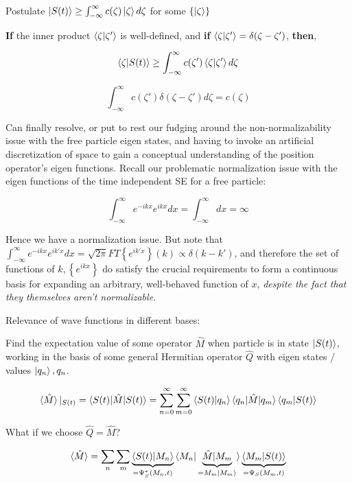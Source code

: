 \documentclass{article}
\begin{document}

Postulate $\ket{S(t)} \geq \int_{- \infty}^\infty c(\zeta) \ket{\zeta} d\zeta$ for some $\{\ket{\zeta}\}$

\textbf{If} the inner product $\braket{\zeta|\zeta'}$ is well-defined, and \textbf{if} $\braket{\zeta|\zeta'} = \delta(\zeta - \zeta')$, \textbf{then},

$$\braket{\zeta|S(t)} \geq \int_{- \infty}^\infty c(\zeta') \braket{\zeta|\zeta'} d \zeta$$

$$\int_{- \infty}^\infty c(\zeta') \delta(\zeta - \zeta') d \zeta = c(\zeta)$$


Can finally resolve, or put to rest our fudging around the non-normalizability issue with the free particle eigen states, and having to invoke an artificial discretization of space to gain a conceptual understanding of the position operator’s eigen functions. Recall our problematic normalization issue with the eigen functions of the time independent SE for a free particle:

$$\int_{- \infty}^\infty e^{- ikx} e^{ikx} dx = \int_{- \infty}^\infty dx = \infty$$

Hence we have a normalization issue. But note that $\int_{- \infty}^\infty e^{- ikx} e^{ik'x} dx = \sqrt{2 \pi} FT \left\{e^{ik'x} \right\} (k) \propto \delta(k-k')$, and therefore the set of functions of $k, \left\{ e^{ikx} \right\}$ do satisfy the crucial requirements to form a continuous basis for expanding an arbitrary, well-behaved function of $x$, \textit{despite the fact that they themselves aren't normalizable.}


Relevance of wave functions in different bases:

Find the expectation value of some operator $\hat{M}$ when particle is in state $\ket{S(t)}$, working in the basis of some general Hermitian operator $\hat{Q}$ with eigen states / values $\ket{q_n}, q_n$. 

$$\braket{\hat{M}}|_{S(t)} = \braket{S(t)|\hat{M}|S(t)} = \sum_{n=0}^\infty \sum_{m=0}^\infty \braket{S(t)|q_n} \braket{q_n|\hat{M}|q_m} \braket{q_m|S(t)}$$

What if we choose $\hat{Q} = \hat{M}$?

$$\braket{\hat{M}} = \sum_n \sum_m \underbrace{\braket{S(t)|M_n}}_{ = \Psi_S^*(M_n,t)} \braket{M_n|\underbrace{\hat{M} | M_m}_{ = M_m \ket{M_m}}} \underbrace{\braket{M_m|S(t)}}_{= \Psi_S(M_m,t)}$$
\end{document}
